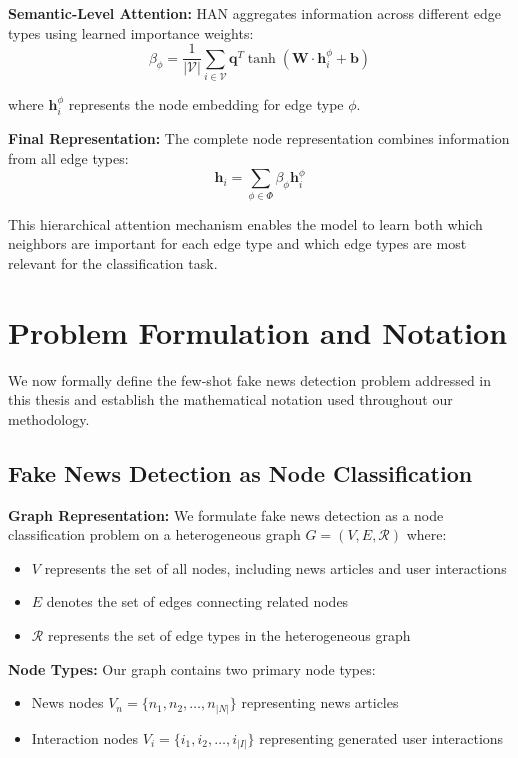 \textbf{Semantic-Level Attention:} HAN aggregates information across different edge types using learned importance weights:
\begin{equation}
\beta_{\phi} = \frac{1}{|\mathcal{V}|} \sum_{i \in \mathcal{V}} \mathbf{q}^T \tanh(\mathbf{W} \cdot \mathbf{h}_i^{\phi} + \mathbf{b})
\end{equation}

where $\mathbf{h}_i^{\phi}$ represents the node embedding for edge type $\phi$.

\textbf{Final Representation:} The complete node representation combines information from all edge types:
\begin{equation}
\mathbf{h}_i = \sum_{\phi \in \Phi} \beta_{\phi} \mathbf{h}_i^{\phi}
\end{equation}

This hierarchical attention mechanism enables the model to learn both which neighbors are important for each edge type and which edge types are most relevant for the classification task.

\section{Problem Formulation and Notation}

We now formally define the few-shot fake news detection problem addressed in this thesis and establish the mathematical notation used throughout our methodology.

\subsection{Fake News Detection as Node Classification}

\textbf{Graph Representation:} We formulate fake news detection as a node classification problem on a heterogeneous graph $G = (V, E, \mathcal{R})$ where:
\begin{itemize}
\item $V$ represents the set of all nodes, including news articles and user interactions
\item $E$ denotes the set of edges connecting related nodes  
\item $\mathcal{R}$ represents the set of edge types in the heterogeneous graph
\end{itemize}

\textbf{Node Types:} Our graph contains two primary node types:
\begin{itemize}
\item News nodes $V_n = \{n_1, n_2, \ldots, n_{|N|}\}$ representing news articles
\item Interaction nodes $V_i = \{i_1, i_2, \ldots, i_{|I|}\}$ representing generated user interactions
\end{itemize}

